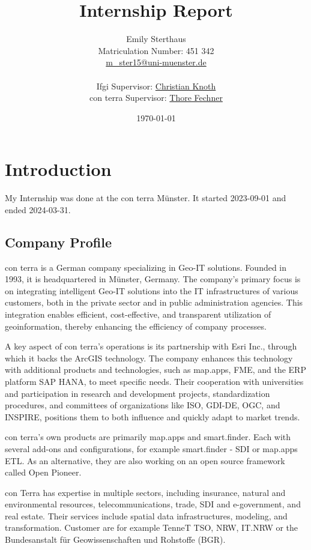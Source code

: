 \documentclass[11pt, titlepage, a4paper]{article}
\title{Internship Report}
\author{Emily Sterthaus \\ Matriculation Number: 451 342 \\ \href{mailto:m_ster15@uni-muenster.de}{m\_ster15@uni-muenster.de}\\ \\
\small Ifgi Supervisor: \href{mailto:christian.knoth@uni-muenster.de}{Christian Knoth}\\ \small con terra Supervisor: \href{mailto:t.fechner@conterra.de}{Thore Fechner}
}
\date{\today}
\begin{document}
\maketitle
\newpage
\tableofcontents
\newpage

\section{Introduction}

My Internship was done at the con terra Münster. It started 2023-09-01 and ended 2024-03-31.
\subsection{Company Profile}

con terra is a German company specializing in Geo-IT solutions. Founded in 1993, it is headquartered in Münster, Germany. The company's primary focus is on integrating intelligent Geo-IT solutions into the IT infrastructures of various customers, both in the private sector and in public administration agencies. This integration enables efficient, cost-effective, and transparent utilization of geoinformation, thereby enhancing the efficiency of company processes.

A key aspect of con terra's operations is its partnership with Esri Inc., through which it backs the ArcGIS technology. The company enhances this technology with additional products and technologies, such as map.apps, FME, and the ERP platform SAP HANA, to meet specific needs. Their cooperation with universities and participation in research and development projects, standardization procedures, and committees of organizations like ISO, GDI-DE, OGC, and INSPIRE, positions them to both influence and quickly adapt to market trends.

con terra's own products are primarily map.apps and smart.finder. Each with several add-ons and configurations, for example smart.finder - SDI or map.apps ETL. As an alternative, they are also working on an open source framework called Open Pioneer.  %

con Terra has expertise in multiple sectors, including insurance, natural and environmental resources, telecommunications, trade, SDI and e-government, and real estate. Their services include spatial data infrastructures, modeling, and transformation. Customer are for example TenneT TSO,   NRW, IT.NRW or the Bundesanstalt für Geowissenschaften und Rohstoffe  (BGR).
\end{document}
